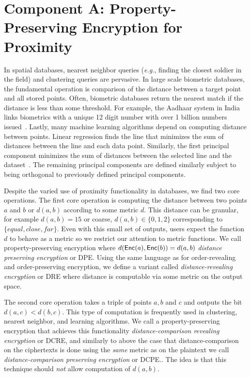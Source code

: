 
\section{Component A:  Property-Preserving Encryption for Proximity}

In spatial databases, nearest neighbor queries (\emph{e.g.}, finding the closest soldier in the field) and clustering queries are pervasive.  %
In large scale biometric databases, the fundamental operation is comparison of the distance between a target point and all stored points. Often, biometric databases return the nearest match if the distance is less than some threshold.  For example, the Aadhaar system in India links biometrics with a unique 12 digit number with over 1 billion numbers issued~\cite{daugman2014600}.  Lastly, many machine learning algorithms depend on computing distance between points. Linear regression finds the line that minimizes the sum of distances between the line and each data point.  Similarly, the first principal component minimizes the sum of distances between the selected line and the dataset~\cite{wold1987principal}.  The remaining principal components are defined similarly subject to being orthogonal to previously defined principal components.

Despite the varied use of proximity functionality in databases, we find two core operations.     The first core operation is computing the distance between two points $a$ and $b$ or $d(a,b)$ according to some metric $d$.  This distance can be granular, for example $d(a, b) =15$ or coarse, $d(a,b)\in\{0,1,2\}$ corresponding to $\{equal, close, far\}$.  Even with this small set of outputs, users expect the function $d$ to behave as a metric so we restrict our attention to metric functions.  We call property-preserving encryption where $d(\mathsf{Enc}(a), \mathsf{Enc}(b)) = d(a,b)$ \emph{distance preserving encryption} or DPE.  Using the same language as for order-revealing and order-preserving encryption, we define a variant called \emph{distance-revealing encryption} or DRE where distance is computable  via some metric on the output space.

The second core operation takes a triple of points $a,b$ and $c$ and outputs the bit $d(a,c)<d(b,c)$.  This type of computation is frequently used in clustering, nearest neighbor, and learning algorithms.   We call a property-preserving encryption that achieves this functionality \emph{distance-comparison revealing encryption} or DCRE, and similarly to above the case that distance-comparison  on the ciphertexts is done using the \emph{same} metric as on the plaintext we call \emph{distance-comparison preserving encryption} or DCPE..  The idea is that this technique should \emph{not} allow computation of $d(a,b)$.

